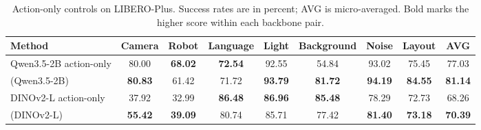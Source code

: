 \begin{table}[htbp]
\vspace{-2mm}
\caption{Action-only controls on LIBERO-Plus. Success rates are in percent; AVG is micro-averaged. Bold marks the higher score within each backbone pair.}
\vspace{2mm}
\label{tab:qwenactiononly}
\centering
\small
\setlength{\tabcolsep}{4pt}
\renewcommand{\arraystretch}{1.15}
\begin{tabular*}{\textwidth}{@{\extracolsep{\fill}}l ccccccc c@{}}
\toprule
Method & Camera & Robot & Language & Light & Background & Noise & Layout & AVG \\
\midrule



Qwen3.5-2B action-only & 80.00 & \textbf{68.02} & \textbf{72.54} & 92.55 & 54.84 & 93.02 & 75.45 & 77.03 \\
\modelname{} (Qwen3.5-2B) & \textbf{80.83} & 61.42 & 71.72 & \textbf{93.79} & \textbf{81.72} & \textbf{94.19} & \textbf{84.55} & \textbf{81.14} \\
\midrule
DINOv2-L action-only & 37.92 & 32.99 & \textbf{86.48} & \textbf{86.96} & \textbf{85.48} & 78.29 & 72.73 & 68.26 \\
\modelname{} (DINOv2-L) & \textbf{55.42} & \textbf{39.09} & 80.74 & 85.71 & 77.42 & \textbf{81.40} & \textbf{73.18} & \textbf{70.39} \\
\bottomrule
\end{tabular*}
\vspace{-2mm}
\end{table}
